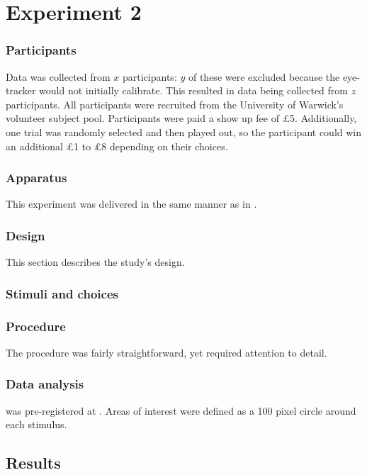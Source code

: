 \documentclass[doc, a4paper, apacite]{apa6}
\begin{document}
\section{Experiment 2} \label{exp:NS07}
\subsubsection{Participants}
Data was collected from $x$ participants: $y$ of these were excluded because the eye-tracker would not initially calibrate. This resulted in data being collected from $z$ participants. All participants were recruited from the University of Warwick's volunteer subject pool. Participants were paid a show up fee of \pounds 5. Additionally, one trial was randomly selected and then played out, so the participant could win an additional \pounds 1 to \pounds 8 depending on their choices. 

\subsubsection{Apparatus}
This experiment was delivered in the same manner as in . 

\subsubsection{Design}
This section describes the study's design.

\subsubsection{Stimuli and choices}

\subsubsection{Procedure}
The procedure was fairly straightforward, yet required
attention to detail.

\subsubsection{Data analysis}
 was pre-registered at \url{}.
Areas of interest were defined as a 100 pixel circle around each stimulus. 

\subsection{Results}
\end{document}
